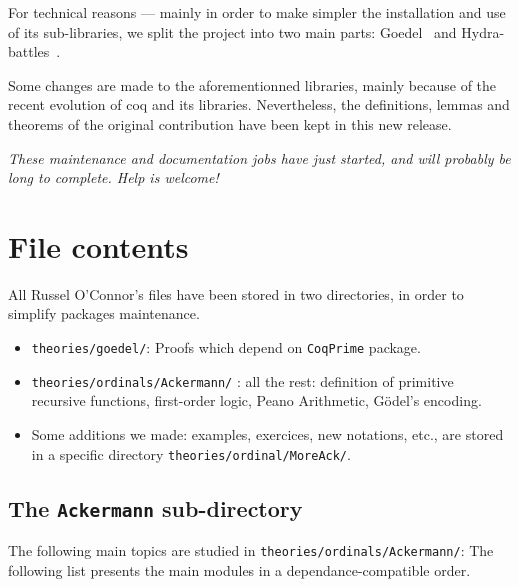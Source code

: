      
        For technical reasons --- mainly in order to make simpler the installation and use of its sub-libraries, we split the project
into two main parts: Goedel~\cite{Goedel} and Hydra-battles~\cite{HydraBattles}.



Some changes are made to the aforementionned libraries, mainly because of the recent evolution of coq and its libraries. Nevertheless, the definitions, lemmas and theorems of the original contribution have been kept in this new release.

\emph{\color{red!80}These maintenance and documentation 
jobs have just started, and will probably be long to complete. Help is welcome!}





\section{File contents}

All Russel O'Connor's files have been stored in two directories, in order to simplify packages maintenance. 

\begin{itemize}
\item \texttt{theories/goedel/}: Proofs which depend on 
\texttt{CoqPrime} package.
\item  \texttt{theories/ordinals/Ackermann/} : all the rest:
 definition of primitive recursive functions, first-order  logic,
Peano Arithmetic, G\"{o}del's encoding.
\item Some additions we made: examples, exercices, new notations, etc.,  are stored in a specific directory \texttt{theories/ordinal/MoreAck/}.
\end{itemize}

\subsection{The \texttt{Ackermann} sub-directory}

The following main topics are studied in  \texttt{theories/ordinals/Ackermann/}: 
The following list presents the main modules 
in a dependance-compatible order.

